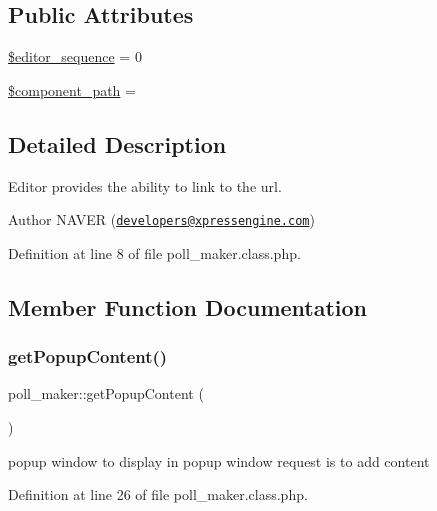 \subsection*{Public Attributes}
\begin{DoxyCompactItemize}
\item 
\hyperlink{classpoll__maker_a17d99b5a9fe1df8e90cc572590e8a5e6}{\$editor\+\_\+sequence} = 0
\item 
\hyperlink{classpoll__maker_aed45da13a32668475091fceb3a3e526d}{\$component\+\_\+path} = \textquotesingle{}\textquotesingle{}
\end{DoxyCompactItemize}


\subsection{Detailed Description}
Editor provides the ability to link to the url. 

\begin{DoxyAuthor}{Author}
N\+A\+V\+ER (\href{mailto:developers@xpressengine.com}{\tt developers@xpressengine.\+com}) 
\end{DoxyAuthor}


Definition at line 8 of file poll\+\_\+maker.\+class.\+php.



\subsection{Member Function Documentation}
\mbox{\label{classpoll__maker_aa332538c710974acc59a6209bb1f5503}} 
\subsubsection{\texorpdfstring{get\+Popup\+Content()}{getPopupContent()}}
{\footnotesize\ttfamily poll\+\_\+maker\+::get\+Popup\+Content (\begin{DoxyParamCaption}{ }\end{DoxyParamCaption})}



popup window to display in popup window request is to add content 



Definition at line 26 of file poll\+\_\+maker.\+class.\+php.

